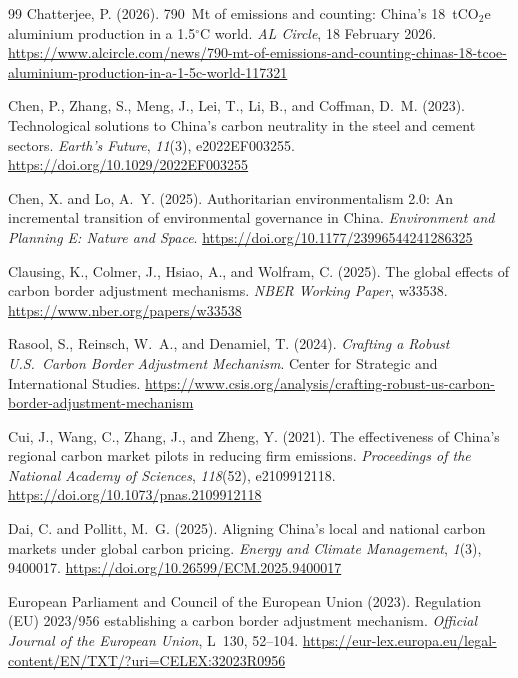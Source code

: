 \documentclass[letterpaper, 10pt, conference]{ieeeconf}
\begin{document}
\begin{thebibliography}{99}
Chatterjee, P. (2026).
790~Mt of emissions and counting: {China}'s 18~tCO$_2$e aluminium production in a 1.5$^\circ$C world.
\textit{AL Circle}, 18 February 2026.
\url{https://www.alcircle.com/news/790-mt-of-emissions-and-counting-chinas-18-tcoe-aluminium-production-in-a-1-5c-world-117321}

Chen, P., Zhang, S., Meng, J., Lei, T., Li, B., and Coffman, D.~M. (2023).
Technological solutions to {China}'s carbon neutrality in the steel and cement sectors.
\textit{Earth's Future}, \textit{11}(3), e2022EF003255.
\url{https://doi.org/10.1029/2022EF003255}

Chen, X. and Lo, A.~Y. (2025).
Authoritarian environmentalism 2.0: An incremental transition of environmental governance in {China}.
\textit{Environment and Planning E: Nature and Space}.
\url{https://doi.org/10.1177/23996544241286325}

Clausing, K., Colmer, J., Hsiao, A., and Wolfram, C. (2025).
The global effects of carbon border adjustment mechanisms.
\textit{NBER Working Paper}, w33538.
\url{https://www.nber.org/papers/w33538}

Rasool, S., Reinsch, W.~A., and Denamiel, T. (2024).
\textit{Crafting a Robust U.S.\ Carbon Border Adjustment Mechanism}.
Center for Strategic and International Studies.
\url{https://www.csis.org/analysis/crafting-robust-us-carbon-border-adjustment-mechanism}

Cui, J., Wang, C., Zhang, J., and Zheng, Y. (2021).
The effectiveness of {China}'s regional carbon market pilots in reducing firm emissions.
\textit{Proceedings of the National Academy of Sciences}, \textit{118}(52), e2109912118.
\url{https://doi.org/10.1073/pnas.2109912118}

Dai, C. and Pollitt, M.~G. (2025).
Aligning {China}'s local and national carbon markets under global carbon pricing.
\textit{Energy and Climate Management}, \textit{1}(3), 9400017.
\url{https://doi.org/10.26599/ECM.2025.9400017}

European Parliament and Council of the European Union (2023).
Regulation ({EU}) 2023/956 establishing a carbon border adjustment mechanism.
\textit{Official Journal of the European Union}, L~130, 52--104.
\url{https://eur-lex.europa.eu/legal-content/EN/TXT/?uri=CELEX:32023R0956}


\end{thebibliography}
\end{document}
